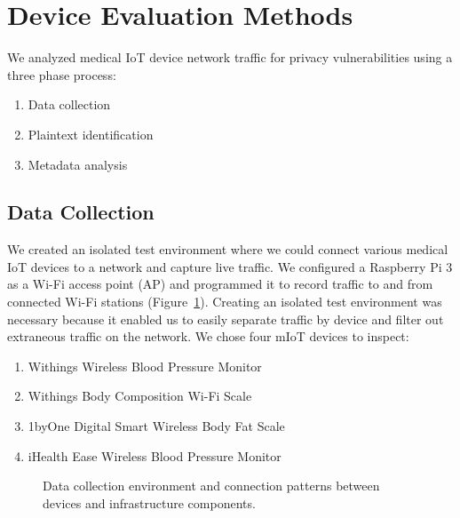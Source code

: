 \section{Device Evaluation Methods}

We analyzed medical IoT device network traffic for privacy vulnerabilities using a three phase process:

\begin{enumerate}
  \item Data collection
  \item Plaintext identification
  \item Metadata analysis
\end{enumerate}

\subsection{Data Collection}

We created an isolated test environment where we could connect various medical IoT devices to a network and capture live traffic. We configured a Raspberry Pi 3 as a Wi-Fi access point (AP) and programmed it to record traffic to and from connected Wi-Fi stations (Figure~\ref{fig:data-collection}).  Creating an isolated test environment was necessary because it enabled us to easily separate traffic by device and filter out extraneous traffic on the network.   We chose four mIoT devices to inspect:

\begin{enumerate}
  \item Withings Wireless Blood Pressure Monitor
  \item Withings Body Composition Wi-Fi Scale
  \item 1byOne Digital Smart Wireless Body Fat Scale
  \item iHealth Ease Wireless Blood Pressure Monitor
\end{enumerate}

\begin{figure}
  \centering
  \caption{Data collection environment and connection patterns between devices and infrastructure components.}
  \label{fig:data-collection}
\end{figure}

